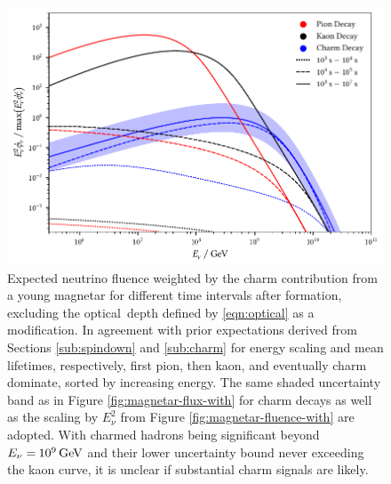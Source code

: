 \begin{figure}[H]
	\centering
	\includegraphics{../plots/build/magnetar_integrated_neutrino_spectrum_without.pdf}
	\caption[Magnetar $\nu \kern+0.5pt$ fluence compared to $c$ decay without optical depth.]
			{Expected neutrino fluence weighted by the charm contribution from a young magnetar for different time
			 intervals after formation, excluding the optical~depth defined by \eqref{eqn:optical} as a modification.
			 In agreement with prior expectations derived from Sections \ref{sub:spindown} and \ref{sub:charm} for energy
			 scaling and mean lifetimes, respectively, first pion, then kaon, and eventually charm dominate, sorted
			 by increasing energy. The same shaded uncertainty band as in Figure \ref{fig:magnetar-flux-with}
			 for charm decays as well as the scaling by $E_\nu^2$ from Figure \ref{fig:magnetar-fluence-with} are adopted.
			 With charmed hadrons being significant beyond $E_\nu = \kern-0.5pt \qty{e9}{\giga\electronvolt}$ and their lower
			 uncertainty bound never exceeding the kaon curve, it is unclear if substantial charm signals are likely.}
	\label{fig:magnetar-fluence-without}
\end{figure}

